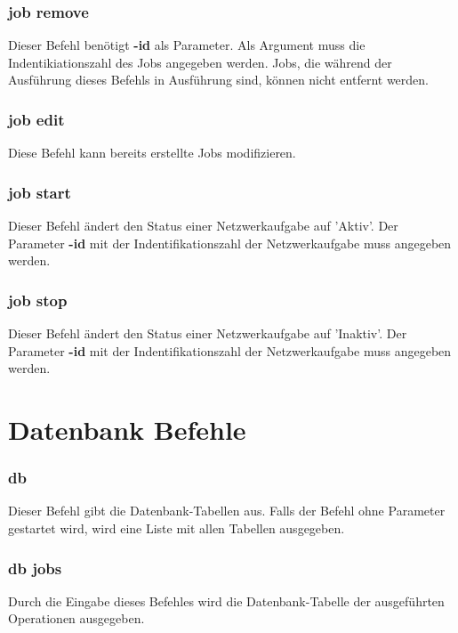 \documentclass[12pt,a4paper]{report}
\begin{document}
\subsubsection{job remove}

Dieser Befehl benötigt \textbf{-id} als Parameter. Als Argument muss die Indentikiationszahl des Jobs angegeben werden. Jobs, die während der Ausführung dieses Befehls in Ausführung sind, können nicht entfernt werden.

\subsubsection{job edit}

Diese Befehl kann bereits erstellte Jobs modifizieren. 

\subsubsection{job start}

Dieser Befehl ändert den Status einer Netzwerkaufgabe auf 'Aktiv'. Der Parameter \textbf{-id} mit der Indentifikationszahl der Netzwerkaufgabe muss angegeben werden.

\subsubsection{job stop}

Dieser Befehl ändert den Status einer Netzwerkaufgabe auf 'Inaktiv'. Der Parameter \textbf{-id} mit der Indentifikationszahl der Netzwerkaufgabe muss angegeben werden.

\section{Datenbank Befehle}

\subsubsection{db}

Dieser Befehl gibt die Datenbank-Tabellen aus. Falls der Befehl ohne Parameter gestartet wird, wird eine Liste mit allen Tabellen ausgegeben.

\subsubsection{db jobs}

Durch die Eingabe dieses Befehles wird die Datenbank-Tabelle der ausgeführten Operationen ausgegeben.
\end{document}

